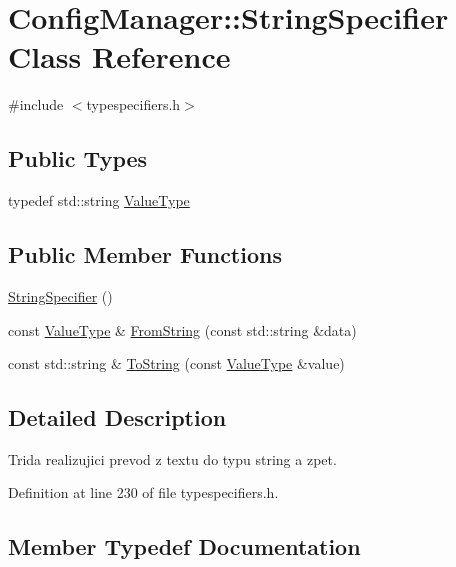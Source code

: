 \hypertarget{class_config_manager_1_1_string_specifier}{}\section{Config\+Manager\+:\+:String\+Specifier Class Reference}
\label{class_config_manager_1_1_string_specifier}


{\ttfamily \#include $<$typespecifiers.\+h$>$}

\subsection*{Public Types}
\begin{DoxyCompactItemize}
\item 
typedef std\+::string \hyperlink{class_config_manager_1_1_string_specifier_ac4bc384955f5da1874779f02c4ff757f}{Value\+Type}
\end{DoxyCompactItemize}
\subsection*{Public Member Functions}
\begin{DoxyCompactItemize}
\item 
\hyperlink{class_config_manager_1_1_string_specifier_a430e783d95729964c8a9a8755146805d}{String\+Specifier} ()
\item 
const \hyperlink{class_config_manager_1_1_string_specifier_ac4bc384955f5da1874779f02c4ff757f}{Value\+Type} \& \hyperlink{class_config_manager_1_1_string_specifier_aced30df1ae4ec0922f3fd87a98b4ca65}{From\+String} (const std\+::string \&data)
\item 
const std\+::string \& \hyperlink{class_config_manager_1_1_string_specifier_a86ad1a911411e7189c55056f7369355d}{To\+String} (const \hyperlink{class_config_manager_1_1_string_specifier_ac4bc384955f5da1874779f02c4ff757f}{Value\+Type} \&value)
\end{DoxyCompactItemize}


\subsection{Detailed Description}
Trida realizujici prevod z textu do typu string a zpet. 

Definition at line 230 of file typespecifiers.\+h.



\subsection{Member Typedef Documentation}
